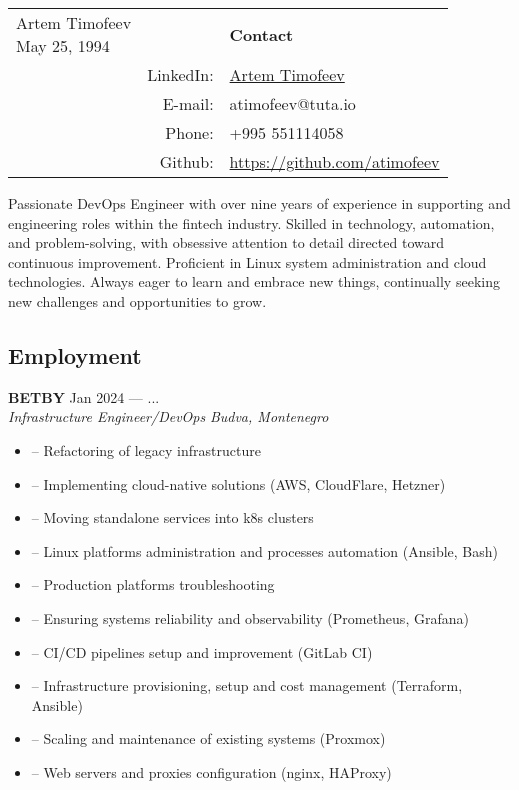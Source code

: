 \documentclass[10pt]{report}
\newenvironment{JobDescription}[5]{
    \vspace{ #5 }
    \flushleft
    {\bf #1 } \hfill { #2 }
    \\
    {\em #3 } \hfill {\em #4 }
    \begin{itemize}
} {
    \end{itemize}
}
\begin{document}
\begin{tabular}{@{}p{}rp{}}
    \bf{\LARGE{Artem Timofeev} \newline{\small{May 25, 1994}}} & & {\bf Contact} \\
    & {\small LinkedIn:}    & {\small \href{https://linkedin.com/in/artem-timofeev-240b7a14b/}{Artem Timofeev}} \\
    & {\small E-mail:}      & {\small atimofeev@tuta.io} \\
    & {\small Phone:}       & {\small +995 551114058} \\
    & {\small Github:}      & {\small \href{https://github.com/atimofeev}{https://github.com/atimofeev}}
\end{tabular}

\vspace{10mm}
{\noindent
    Passionate DevOps Engineer with over nine years of experience in supporting and engineering roles within the fintech industry. Skilled in technology, automation, and problem-solving, with obsessive attention to detail directed toward continuous improvement. Proficient in Linux system administration and cloud technologies. Always eager to learn and embrace new things, continually seeking new challenges and opportunities to grow.
}
\vspace{5mm}

\subsection*{Employment}
\begin{JobDescription}{BETBY}{Jan 2024 --- ...}{Infrastructure Engineer/DevOps}{Budva, Montenegro}{0mm}
  \item[--] Refactoring of legacy infrastructure
  \item[--] Implementing cloud-native solutions (AWS, CloudFlare, Hetzner)
  \item[--] Moving standalone services into k8s clusters
  \item[--] Linux platforms administration and processes automation (Ansible, Bash)
  \item[--] Production platforms troubleshooting 
  \item[--] Ensuring systems reliability and observability (Prometheus, Grafana)
  \item[--] CI/CD pipelines setup and improvement (GitLab CI)
  \item[--] Infrastructure provisioning, setup and cost management (Terraform, Ansible)
  \item[--] Scaling and maintenance of existing systems (Proxmox)
  \item[--] Web servers and proxies configuration (nginx, HAProxy)
\end{JobDescription}
\end{document}
